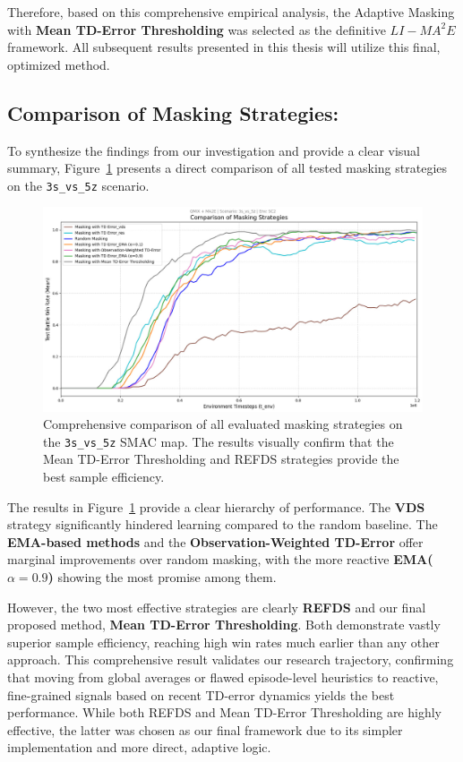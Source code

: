 Therefore, based on this comprehensive empirical analysis, the Adaptive Masking with \textbf{Mean TD-Error Thresholding} was selected as the definitive $LI-{MA}^2E$ framework. All subsequent results presented in this thesis will utilize this final, optimized method.
\subsection{Comparison of Masking Strategies:}

To synthesize the findings from our investigation and provide a clear visual summary, Figure~\ref{fig:all_strategies_comparison} presents a direct comparison of all tested masking strategies on the  \texttt{3s\_vs\_5z} scenario.
\begin{figure}[h]
    \centering
    \includegraphics[width=1.0\textwidth]{images_pfe/results_li-ma2e/compare_scores.jpg} 
    \caption{Comprehensive comparison of all evaluated masking strategies on the \texttt{3s\_vs\_5z}  SMAC map. The results visually confirm that the Mean TD-Error Thresholding and REFDS strategies provide the best sample efficiency.}
    \label{fig:all_strategies_comparison}
\end{figure}

The results in Figure~\ref{fig:all_strategies_comparison} provide a clear hierarchy of performance. The \textbf{VDS} strategy significantly hindered learning compared to the random baseline. The \textbf{EMA-based methods} and the \textbf{Observation-Weighted TD-Error} offer marginal improvements over random masking, with the more reactive \textbf{EMA($\alpha=0.9$)} showing the most promise among them.

However, the two most effective strategies are clearly \textbf{REFDS} and our final proposed method, \textbf{Mean TD-Error Thresholding}. Both demonstrate vastly superior sample efficiency, reaching high win rates much earlier than any other approach. This comprehensive result validates our research trajectory, confirming that moving from global averages or flawed episode-level heuristics to reactive, fine-grained signals based on recent TD-error dynamics yields the best performance. While both REFDS and Mean TD-Error Thresholding are highly effective, the latter was chosen as our final framework due to its simpler implementation and more direct, adaptive logic.

